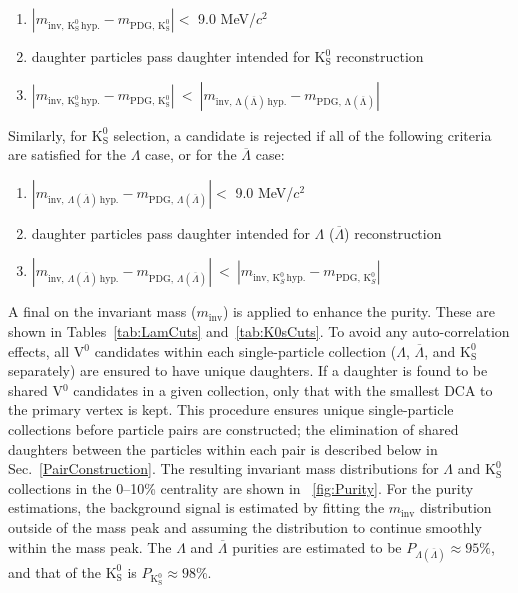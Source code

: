 \documentclass[ALICE,manyauthors]{cernphprep}
\newcommand{\minv}{$m_{\mathrm{inv}}$\xspace}
\newcommand{\Lam}{$\Lambda$\xspace}
\newcommand{\ALam}{$\overline{\Lambda}$\xspace}
\newcommand{\LamALam}{$\Lambda$ ($\overline{\Lambda}$)\xspace}
\newcommand{\Ks}{$\mathrm{K^{0}_{S}}$\xspace}
\newcommand{\Vz}{V$^{0}$\xspace}
\begin{document}
\begin{enumerate}
 \item $\left|m_{\mathrm{inv,\,K^{0}_{S}\,hyp.}} - m_{\mathrm{PDG,\,K^{0}_{S}}}\right| < $ 9.0 MeV/$c^{2}${\color{blue}{,}}
 \item {\color{red}{The}} daughter particles pass daughter {\color{red}{cuts}} {\color{blue}{selection criteria}} intended for \Ks reconstruction{\color{blue}{,}}
 \item $\left|m_{\mathrm{inv,\,K^{0}_{S}\,hyp.}} - m_{\mathrm{PDG,\,K^{0}_{S}}}\right|~ < ~\left|m_{\mathrm{inv,\,\Lambda(\overline{\Lambda})\,hyp.}} - m_{\mathrm{PDG,\,\Lambda(\overline{\Lambda})}}\right|${\color{blue}{.}}
\end{enumerate} 
Similarly, for \Ks selection, a candidate is rejected if all of the following criteria are satisfied for the \Lam case, or for the \ALam case:
\begin{enumerate}
 \item $\left|m_{\mathrm{inv},\,\Lambda(\overline{\Lambda})\,\mathrm{hyp.}} - m_{\mathrm{PDG},\,\Lambda(\overline{\Lambda})}\right| < $ 9.0 MeV/$c^{2}${\color{blue}{,}}
 \item {\color{red}{The}} daughter particles pass daughter {\color{red}{cuts}} {\color{blue}{selection criteria}} intended for \LamALam reconstruction{\color{blue}{,}}
 \item $\left|m_{\mathrm{inv},\,\Lambda(\overline{\Lambda})\,\mathrm{hyp.}} - m_{\mathrm{PDG},\,\Lambda(\overline{\Lambda})}\right|~ < ~\left|m_{\mathrm{inv},\,\mathrm{K}^{0}_{S}\,\mathrm{hyp.}} - m_{\mathrm{PDG},\,\mathrm{K}^{0}_{S}}\right|${\color{blue}{.}}
\end{enumerate} 

A final {\color{red}{cut}} {\color{blue}{restriction}} on the invariant mass (\minv) is applied to enhance the purity.
These {\color{red}{cuts}} {\color{blue}{selection criteria}} are shown in Tables~\ref{tab:LamCuts} and~\ref{tab:K0sCuts}.
To avoid any auto-correlation effects, all \Vz candidates within each single-particle collection (\Lam, \ALam, and \Ks separately) are ensured to have unique daughters. 
If a daughter is found to be shared {\color{red}{between}} {\color{blue}{among}} \Vz candidates in a given collection, only that with the smallest DCA to the primary vertex is kept.
This procedure ensures unique single-particle collections before particle pairs are constructed; the elimination of shared daughters between the particles within each pair is described below in Sec.~\ref{PairConstruction}.
The resulting invariant mass distributions for \Lam and \Ks collections in the 0--10\% centrality {\color{red}{bin}} {\color{blue}{interval}} are shown in {\color{red}{Figure}} {\color{blue}{Fig.}}~\ref{fig:Purity}.
For the purity estimations, the background signal is estimated by fitting the \minv distribution outside of the mass peak and assuming the distribution to continue smoothly within the mass peak.
The \Lam and \ALam purities are estimated to be $P_{\Lambda(\overline{\Lambda})} \approx 95\%$, and that of the \Ks is $P_{\mathrm{K^{0}_{S}}} \approx 98\%$.
\end{document}
